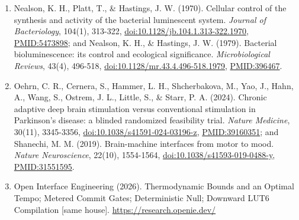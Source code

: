 \documentclass[10pt,letterpaper]{article}
\begin{document}
\begin{enumerate}
  (2019). Intranasal administration of extracellular vesicles derived
  from human teeth stem cells in 6-hydroxydopamine-treated rats.
  \emph{Stem Cells Translational Medicine}, 8(5), 490-499,
  \href{https://doi.org/10.1002/sctm.18-0162}{doi:10.1002/sctm.18-0162},
  \url{PMID:30706999}; Webb, R. L., Kaiser, E. E., Jurgielewicz, B. J.,
  et al., \& Stice, S. L. (2018). Human neural stem cell extracellular
  vesicles improve recovery in a porcine model of ischemic stroke.
  \emph{Stroke}, 49(5), 1248-1256,
  \href{https://doi.org/10.1161/STROKEAHA.117.020353}{doi:10.1161/STROKEAHA.117.020353},
  \url{PMID:29650593}; and Xin, H., Li, Y., Cui, Y., Yang, J. J., Zhang,
  Z. G., \& Chopp, M. (2013). Systemic administration of exosomes
  released from mesenchymal stromal cells promote functional recovery
  after stroke in rats. \emph{Journal of Cerebral Blood Flow \&
  Metabolism}, 33(11), 1711-1715,
  \href{https://doi.org/10.1038/jcbfm.2013.152}{doi:10.1038/jcbfm.2013.152},
  \url{PMID:23963371}.
\item
  Nealson, K. H., Platt, T., \& Hastings, J. W. (1970). Cellular control
  of the synthesis and activity of the bacterial luminescent system.
  \emph{Journal of Bacteriology}, 104(1), 313-322,
  \href{https://doi.org/10.1128/jb.104.1.313-322.1970}{doi:10.1128/jb.104.1.313-322.1970},
  \url{PMID:5473898}; and Nealson, K. H., \& Hastings, J. W. (1979).
  Bacterial bioluminescence: its control and ecological significance.
  \emph{Microbiological Reviews}, 43(4), 496-518,
  \href{https://doi.org/10.1128/mr.43.4.496-518.1979}{doi:10.1128/mr.43.4.496-518.1979},
  \url{PMID:396467}.
\item
  Oehrn, C. R., Cernera, S., Hammer, L. H., Shcherbakova, M., Yao, J.,
  Hahn, A., Wang, S., Ostrem, J. L., Little, S., \& Starr, P. A. (2024).
  Chronic adaptive deep brain stimulation versus conventional
  stimulation in Parkinson's disease: a blinded randomized feasibility
  trial. \emph{Nature Medicine}, 30(11), 3345-3356,
  \href{https://doi.org/10.1038/s41591-024-03196-z}{doi:10.1038/s41591-024-03196-z},
  \url{PMID:39160351}; and Shanechi, M. M. (2019). Brain-machine
  interfaces from motor to mood. \emph{Nature Neuroscience}, 22(10),
  1554-1564,
  \href{https://doi.org/10.1038/s41593-019-0488-y}{doi:10.1038/s41593-019-0488-y},
  \url{PMID:31551595}.
\item
  Open Interface Engineering (2026). Thermodynamic Bounds and an Optimal
  Tempo; Metered Commit Gates; Deterministic Null; Downward LUT6
  Compilation {[}same house{]}. \url{https://research.openie.dev/}

\end{enumerate}
\end{document}
